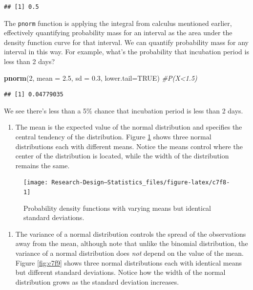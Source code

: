 \documentclass[
]{book}
\newenvironment{Shaded}{\begin{snugshade}}{\end{snugshade}}
\newcommand{\AttributeTok}[1]{\textcolor[rgb]{0.13,0.29,0.53}{#1}}
\newcommand{\CommentTok}[1]{\textcolor[rgb]{0.56,0.35,0.01}{\textit{#1}}}
\newcommand{\ConstantTok}[1]{\textcolor[rgb]{0.56,0.35,0.01}{#1}}
\newcommand{\DecValTok}[1]{\textcolor[rgb]{0.00,0.00,0.81}{#1}}
\newcommand{\FloatTok}[1]{\textcolor[rgb]{0.00,0.00,0.81}{#1}}
\newcommand{\FunctionTok}[1]{\textcolor[rgb]{0.13,0.29,0.53}{\textbf{#1}}}
\newcommand{\NormalTok}[1]{#1}
\providecommand{\tightlist}{%
  \setlength{\itemsep}{0pt}\setlength{\parskip}{0pt}}
\begin{document}
\begin{verbatim}
## [1] 0.5
\end{verbatim}

The \texttt{pnorm} function is applying the integral from calculus mentioned earlier, effectively quantifying probability mass for an interval as the area under the density function curve for that interval. We can quantify probability mass for any interval in this way. For example, what's the probability that incubation period is less than 2 days?

\begin{Shaded}
\begin{Highlighting}[]
\FunctionTok{pnorm}\NormalTok{(}\DecValTok{2}\NormalTok{, }\AttributeTok{mean =} \FloatTok{2.5}\NormalTok{, }\AttributeTok{sd =} \FloatTok{0.3}\NormalTok{, }\AttributeTok{lower.tail=}\ConstantTok{TRUE}\NormalTok{) }\CommentTok{\#P(X\textless{}1.5)}
\end{Highlighting}
\end{Shaded}

\begin{verbatim}
## [1] 0.04779035
\end{verbatim}

We see there's less than a 5\% chance that incubation period is less than 2 days.

\begin{enumerate}
\def\labelenumi{\arabic{enumi}.}
\setcounter{enumi}{1}
\tightlist
\item
  The mean is the expected value of the normal distribution and specifies the central tendency of the distribution. Figure \ref{fig:c7f8} shows three normal distributions each with different means. Notice the means control where the center of the distribution is located, while the width of the distribution remains the same.
\end{enumerate}

\begin{figure}

{\centering \texttt{[image: Research-Design---Statistics\_files/figure-latex/c7f8-1]} 

}

\caption{Probability density functions with varying means but identical standard deviations.}\label{fig:c7f8}
\end{figure}

\begin{enumerate}
\def\labelenumi{\arabic{enumi}.}
\setcounter{enumi}{2}
\tightlist
\item
  The variance of a normal distribution controls the spread of the observations away from the mean, although note that unlike the binomial distribution, the variance of a normal distribution does \emph{not} depend on the value of the mean. Figure \ref{fig:c7f9} shows three normal distributions each with identical means but different standard deviations. Notice how the width of the normal distribution grows as the standard deviation increases.
\end{enumerate}
\end{document}
